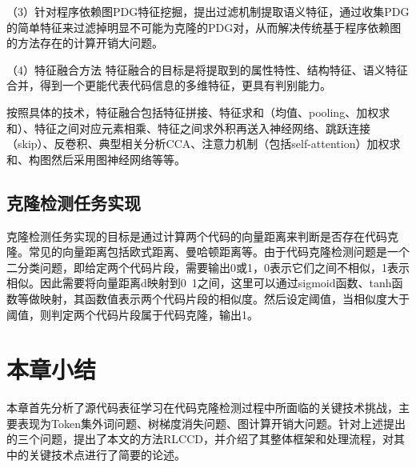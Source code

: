 （3）针对程序依赖图PDG特征挖掘，提出过滤机制提取语义特征，通过收集PDG的简单特征来过滤掉明显不可能为克隆的PDG对，从而解决传统基于程序依赖图的方法存在的计算开销大问题。

（4）特征融合方法
特征融合的目标是将提取到的属性特性、结构特征、语义特征合并，得到一个更能代表代码信息的多维特征，更具有判别能力。

按照具体的技术，特征融合包括特征拼接、特征求和（均值、pooling、加权求和）、特征之间对应元素相乘、特征之间求外积再送入神经网络、跳跃连接（skip）、反卷积、典型相关分析CCA、注意力机制（包括self-attention）加权求和、构图然后采用图神经网络等等。

\subsection{克隆检测任务实现}
克隆检测任务实现的目标是通过计算两个代码的向量距离来判断是否存在代码克隆。常见的向量距离包括欧式距离、曼哈顿距离等。由于代码克隆检测问题是一个二分类问题，即给定两个代码片段，需要输出0或1，0表示它们之间不相似，1表示相似。因此需要将向量距离d映射到0~1之间，这里可以通过sigmoid函数、tanh函数等做映射，其函数值表示两个代码片段的相似度。然后设定阈值，当相似度大于阈值，则判定两个代码片段属于代码克隆，输出1。

\section{本章小结}
本章首先分析了源代码表征学习在代码克隆检测过程中所面临的关键技术挑战，主要表现为Token集外词问题、树梯度消失问题、图计算开销大问题。针对上述提出的三个问题，提出了本文的方法RLCCD，并介绍了其整体框架和处理流程，对其中的关键技术点进行了简要的论述。



